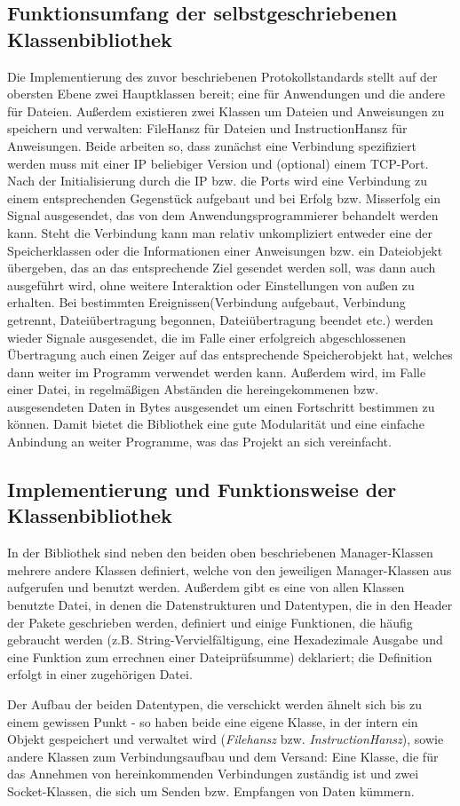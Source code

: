 \subsection{Funktionsumfang der selbstgeschriebenen Klassenbibliothek}
Die Implementierung des zuvor beschriebenen Protokollstandards stellt auf der obersten Ebene zwei Hauptklassen bereit; eine für Anwendungen und die andere für Dateien.
Außerdem existieren zwei Klassen um Dateien und Anweisungen zu speichern und verwalten: FileHansz für Dateien und InstructionHansz für Anweisungen.
Beide arbeiten so, dass zunächst eine Verbindung spezifiziert werden muss mit einer IP beliebiger Version und (optional) einem TCP-Port.
Nach der Initialisierung durch die IP bzw. die Ports wird eine Verbindung zu einem entsprechenden Gegenstück aufgebaut und bei Erfolg bzw. Misserfolg ein Signal ausgesendet, das von dem Anwendungsprogrammierer behandelt werden kann.
Steht die Verbindung kann man relativ unkompliziert entweder eine der Speicherklassen oder die Informationen einer Anweisungen bzw. ein Dateiobjekt übergeben, das an das entsprechende Ziel gesendet werden soll, was dann auch ausgeführt wird, ohne weitere Interaktion oder Einstellungen von außen zu erhalten.
Bei bestimmten Ereignissen(Verbindung aufgebaut, Verbindung getrennt, Dateiübertragung begonnen, Dateiübertragung beendet etc.) werden wieder Signale ausgesendet, die im Falle einer erfolgreich abgeschlossenen Übertragung auch einen Zeiger auf das entsprechende Speicherobjekt hat, welches dann weiter im Programm verwendet werden kann.
Außerdem wird, im Falle einer Datei, in regelmäßigen Abständen die hereingekommenen bzw. ausgesendeten Daten in Bytes ausgesendet um einen Fortschritt bestimmen zu können.
Damit bietet die Bibliothek eine gute Modularität und eine einfache Anbindung an weiter Programme, was das Projekt an sich vereinfacht.

\subsection{Implementierung und Funktionsweise der Klassenbibliothek}
In der Bibliothek sind neben den beiden oben beschriebenen Manager-Klassen mehrere andere Klassen definiert, welche von den jeweiligen Manager-Klassen aus aufgerufen und benutzt werden.
Außerdem gibt es eine von allen Klassen benutzte Datei, in denen die Datenstrukturen und Datentypen, die in den Header der Pakete geschrieben werden, definiert und einige Funktionen, die häufig gebraucht werden (z.B. String-Vervielfältigung, eine Hexadezimale Ausgabe und eine Funktion zum errechnen einer Dateiprüfsumme) deklariert; die Definition erfolgt in einer zugehörigen Datei.\par
Der Aufbau der beiden Datentypen, die verschickt werden ähnelt sich bis zu einem gewissen Punkt - so haben beide eine eigene Klasse, in der intern ein Objekt gespeichert und verwaltet wird (\textit{Filehansz} bzw. \textit{InstructionHansz}), sowie andere Klassen zum Verbindungsaufbau und dem Versand: Eine Klasse, die für das Annehmen von hereinkommenden Verbindungen zuständig ist und zwei Socket-Klassen, die sich um Senden bzw. Empfangen von Daten kümmern.

%